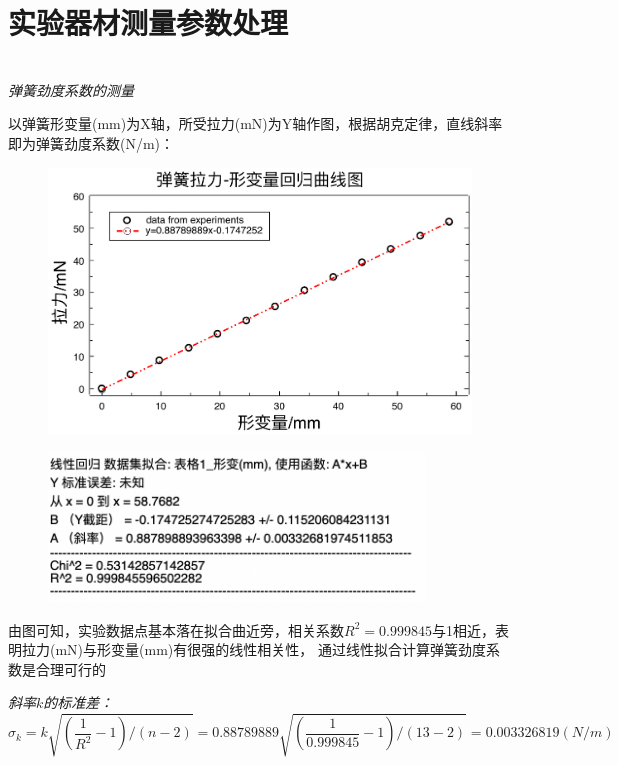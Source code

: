 \documentclass[UTF8]{ctexart}
\begin{document}
    \section{实验器材测量参数处理}

    \begin{center}
        \emph{\\[0.01cm]弹簧劲度系数的测量}
    \end{center}

    以弹簧形变量(mm)为X轴，所受拉力(mN)为Y轴作图，根据胡克定律，直线斜率即为弹簧劲度系数(N/m)：

    \begin{figure}[ht]
        \centering 
        \includegraphics[width=13cm]{l.pdf}
    \end{figure}

    \begin{figure}[ht]
        \centering
        \includegraphics[width=10cm]{l1.png}
    \end{figure}

    由图可知，实验数据点基本落在拟合曲近旁，相关系数$R^2=0.999845$与1相近，表明拉力(mN)与形变量(mm)有很强的线性相关性，
    通过线性拟合计算弹簧劲度系数是合理可行的

    \emph{斜率$k$的标准差：}
    \begin{equation*}
        \sigma_k =k\sqrt{(\frac{1}{R^2}-1)/(n-2)}=0.88789889\sqrt{(\frac{1}{0.999845}-1)/(13-2)} =0.003326819 (N/m)
    \end{equation*}
\end{document}
